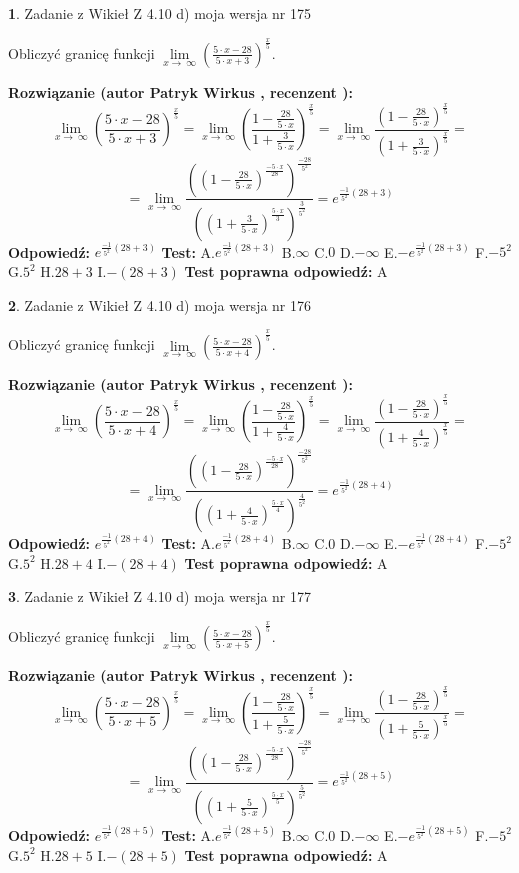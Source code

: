 \documentclass[12pt, a4paper]{article}
\theoremstyle{definition} %
\newtheorem{zad}{}
\newcommand{\zadStart}[1]{\begin{zad}#1\newline}
\newcommand{\zadStop}{\end{zad}}
\newcommand{\rozwStart}[2]{\noindent \textbf{Rozwiązanie (autor #1 , recenzent #2): }\newline}
\newcommand{\rozwStop}{\newline}
\newcommand{\odpStart}{\noindent \textbf{Odpowiedź:}\newline}
\newcommand{\odpStop}{\newline}
\newcommand{\testStart}{\noindent \textbf{Test:}\newline}
\newcommand{\testStop}{\newline}
\newcommand{\kluczStart}{\noindent \textbf{Test poprawna odpowiedź:}\newline}
\newcommand{\kluczStop}{\newline}
\begin{document}
\zadStart{Zadanie z Wikieł Z 4.10 d) moja wersja nr 175}


Obliczyć granicę funkcji  $\lim\limits_{x\to\ \infty}(\frac{5\cdot x-28}{5\cdot x+3})^{\frac{x}{5}}$.
\zadStop
\rozwStart{Patryk Wirkus}{}
$$\lim\limits_{x\to\ \infty}(\frac{5\cdot x-28}{5\cdot x+3})^{\frac{x}{5}} = \lim\limits_{x\to\ \infty}(\frac{1-\frac{28}{5\cdot x}}{1+\frac{3}{5\cdot x}})^{\frac{x}{5}}=\lim\limits_{x\to\ \infty}\frac{(1-\frac{28}{5\cdot x})^{\frac{x}{5}}}{(1+\frac{3}{5\cdot x})^{\frac{x}{5}}}=$$
$$=\lim\limits_{x\to\ \infty}\frac{((1-\frac{28}{5\cdot x})^{\frac{-5\cdot x}{28}})^{\frac{-28}{5^{2}}}}{((1+\frac{3}{5\cdot x})^{\frac{5\cdot x}{3}})^{\frac{3}{5^{2}}}}=e^{\frac{-1}{5^{2}}(28+3)}$$
\rozwStop
\odpStart
$e^{\frac{-1}{5^{2}}(28+3)}$
\odpStop
\testStart
A.$e^{\frac{-1}{5^{2}}(28+3)}$ B.$\infty$ C.$0$ D.$-\infty$ E.$-e^{\frac{-1}{5^{2}}(28+3)}$
F.$-5^{2}$ G.$5^{2}$
H.$28+3$
I.$-(28+3)$
\testStop
\kluczStart
A
\kluczStop



\zadStart{Zadanie z Wikieł Z 4.10 d) moja wersja nr 176}


Obliczyć granicę funkcji  $\lim\limits_{x\to\ \infty}(\frac{5\cdot x-28}{5\cdot x+4})^{\frac{x}{5}}$.
\zadStop
\rozwStart{Patryk Wirkus}{}
$$\lim\limits_{x\to\ \infty}(\frac{5\cdot x-28}{5\cdot x+4})^{\frac{x}{5}} = \lim\limits_{x\to\ \infty}(\frac{1-\frac{28}{5\cdot x}}{1+\frac{4}{5\cdot x}})^{\frac{x}{5}}=\lim\limits_{x\to\ \infty}\frac{(1-\frac{28}{5\cdot x})^{\frac{x}{5}}}{(1+\frac{4}{5\cdot x})^{\frac{x}{5}}}=$$
$$=\lim\limits_{x\to\ \infty}\frac{((1-\frac{28}{5\cdot x})^{\frac{-5\cdot x}{28}})^{\frac{-28}{5^{2}}}}{((1+\frac{4}{5\cdot x})^{\frac{5\cdot x}{4}})^{\frac{4}{5^{2}}}}=e^{\frac{-1}{5^{2}}(28+4)}$$
\rozwStop
\odpStart
$e^{\frac{-1}{5^{2}}(28+4)}$
\odpStop
\testStart
A.$e^{\frac{-1}{5^{2}}(28+4)}$ B.$\infty$ C.$0$ D.$-\infty$ E.$-e^{\frac{-1}{5^{2}}(28+4)}$
F.$-5^{2}$ G.$5^{2}$
H.$28+4$
I.$-(28+4)$
\testStop
\kluczStart
A
\kluczStop



\zadStart{Zadanie z Wikieł Z 4.10 d) moja wersja nr 177}


Obliczyć granicę funkcji  $\lim\limits_{x\to\ \infty}(\frac{5\cdot x-28}{5\cdot x+5})^{\frac{x}{5}}$.
\zadStop
\rozwStart{Patryk Wirkus}{}
$$\lim\limits_{x\to\ \infty}(\frac{5\cdot x-28}{5\cdot x+5})^{\frac{x}{5}} = \lim\limits_{x\to\ \infty}(\frac{1-\frac{28}{5\cdot x}}{1+\frac{5}{5\cdot x}})^{\frac{x}{5}}=\lim\limits_{x\to\ \infty}\frac{(1-\frac{28}{5\cdot x})^{\frac{x}{5}}}{(1+\frac{5}{5\cdot x})^{\frac{x}{5}}}=$$
$$=\lim\limits_{x\to\ \infty}\frac{((1-\frac{28}{5\cdot x})^{\frac{-5\cdot x}{28}})^{\frac{-28}{5^{2}}}}{((1+\frac{5}{5\cdot x})^{\frac{5\cdot x}{5}})^{\frac{5}{5^{2}}}}=e^{\frac{-1}{5^{2}}(28+5)}$$
\rozwStop
\odpStart
$e^{\frac{-1}{5^{2}}(28+5)}$
\odpStop
\testStart
A.$e^{\frac{-1}{5^{2}}(28+5)}$ B.$\infty$ C.$0$ D.$-\infty$ E.$-e^{\frac{-1}{5^{2}}(28+5)}$
F.$-5^{2}$ G.$5^{2}$
H.$28+5$
I.$-(28+5)$
\testStop
\kluczStart
A
\kluczStop
\end{document}

